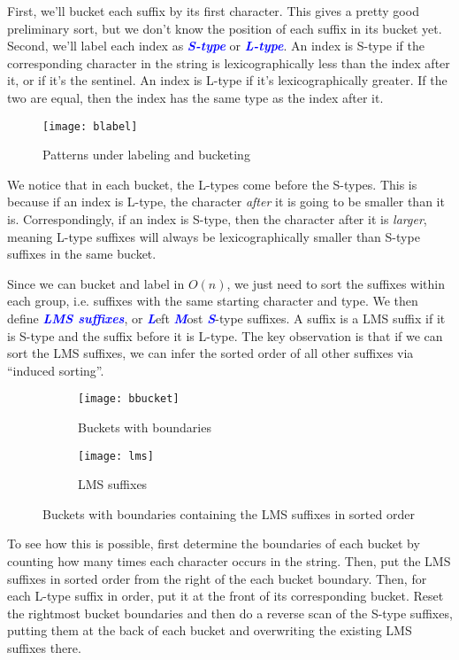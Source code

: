 \documentclass[11pt, oneside]{article}
\newcommand{\emphasis}[1]{\textcolor{blue}{\textbf{\textit{#1}}}}
\begin{document}
First, we'll bucket each suffix by its first character.
This gives a pretty good preliminary sort, but we don't know the position of each
suffix in its bucket yet. Second, we'll label each index as \emphasis{S-type} or \emphasis{L-type}.
An index is S-type if the corresponding character in the string is lexicographically less than the index after it, or if it's the sentinel. An index is L-type if it's lexicographically greater. If the two are equal, then the index has the same type as the index after it.

\begin{figure}[h!]
\centering
\texttt{[image: blabel]}
\caption{Patterns under labeling and bucketing}
\end{figure}

We notice that in each bucket, the L-types come before the S-types.
This is because if an index is L-type, the character \textit{after} it is going to be smaller than it is.
Correspondingly, if an index is S-type, then the character after it is \textit{larger},
meaning L-type suffixes will always be lexicographically smaller than S-type suffixes in the same bucket.

Since we can bucket and label in \( O(n) \), we just need to sort the suffixes
within each group, i.e. suffixes with the same starting character and type.
We then define \emphasis{LMS suffixes}, or \emphasis{L}eft \emphasis{M}ost \emphasis{S}-type suffixes.
A suffix is a LMS suffix if it is S-type and the suffix before it is L-type.
The key observation is that if we can sort the LMS suffixes, we can
infer the sorted order of all other suffixes via ``induced sorting''.


\begin{figure}[h!]
    \centering
    \begin{subfigure}[h]{\textwidth}
      \centering
      \texttt{[image: bbucket]}
      \caption{Buckets with boundaries}
    \end{subfigure}
    \newline
    \begin{subfigure}[h]{\textwidth}
      \centering
      \texttt{[image: lms]}
      \caption{LMS suffixes}
    \end{subfigure}
    \caption{Buckets with boundaries containing the LMS suffixes in sorted order}
\end{figure}

To see how this is possible, first determine the boundaries of each bucket by counting
how many times each character occurs in the string.
Then, put the LMS suffixes in sorted order from the right of the each bucket boundary.
Then, for each L-type suffix in order, put it at the front of its corresponding bucket.
Reset the rightmost bucket boundaries and then do a reverse scan of the S-type suffixes,
putting them at the back of each bucket and overwriting the existing LMS suffixes there.
\end{document}
